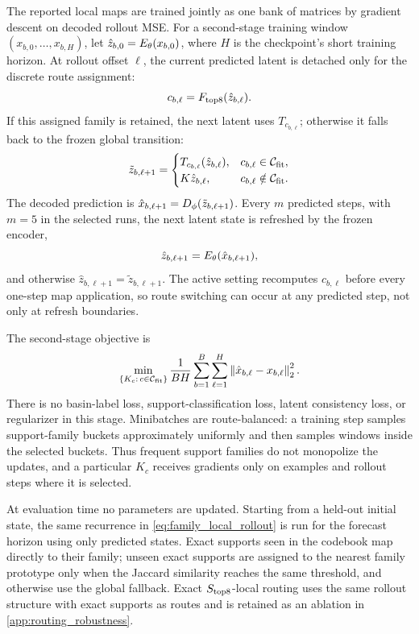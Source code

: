 The reported local maps are trained jointly as one bank of matrices by gradient descent on decoded rollout MSE. For a second-stage training window \((x_{b,0},\ldots,x_{b,H})\), let \(\hat z_{b,0}=E_\theta(x_{b,0})\), where \(H\) is the checkpoint's short training horizon. At rollout offset \(\ell\), the current predicted latent is detached only for the discrete route assignment:
\[
  c_{b,\ell}=F_{\rm top8}(\hat z_{b,\ell}).
\]
If this assigned family is retained, the next latent uses \(T_{c_{b,\ell}}\); otherwise it falls back to the frozen global transition:
\begin{equation}
  \tilde z_{b,\ell+1}=
  \begin{cases}
    T_{c_{b,\ell}}(\hat z_{b,\ell}), & c_{b,\ell}\in\mathcal C_{\rm fit},\\
    K\hat z_{b,\ell}, & c_{b,\ell}\notin\mathcal C_{\rm fit}.
  \end{cases}
  \label{eq:family_local_rollout}
\end{equation}
The decoded prediction is \(\hat x_{b,\ell+1}=D_\phi(\tilde z_{b,\ell+1})\). Every \(m\) predicted steps, with \(m=5\) in the selected runs, the next latent state is refreshed by the frozen encoder,
\[
  \hat z_{b,\ell+1}=E_\theta(\hat x_{b,\ell+1}),
\]
and otherwise \(\hat z_{b,\ell+1}=\tilde z_{b,\ell+1}\). The active setting recomputes \(c_{b,\ell}\) before every one-step map application, so route switching can occur at any predicted step, not only at refresh boundaries.

The second-stage objective is
\begin{equation}
  \min_{\{K_c:\,c\in\mathcal C_{\rm fit}\}}
  \frac{1}{BH}\sum_{b=1}^{B}\sum_{\ell=1}^{H}
  \left\lVert \hat x_{b,\ell}-x_{b,\ell} \right\rVert_2^2 .
  \label{eq:stage2_local_loss}
\end{equation}
There is no basin-label loss, support-classification loss, latent consistency loss, or regularizer in this stage. Minibatches are route-balanced: a training step samples support-family buckets approximately uniformly and then samples windows inside the selected buckets. Thus frequent support families do not monopolize the updates, and a particular \(K_c\) receives gradients only on examples and rollout steps where it is selected.

At evaluation time no parameters are updated. Starting from a held-out initial state, the same recurrence in \cref{eq:family_local_rollout} is run for the forecast horizon using only predicted states. Exact supports seen in the codebook map directly to their family; unseen exact supports are assigned to the nearest family prototype only when the Jaccard similarity reaches the same threshold, and otherwise use the global fallback. Exact \(S_{\rm top8}\)-local routing uses the same rollout structure with exact supports as routes and is retained as an ablation in \cref{app:routing_robustness}.

